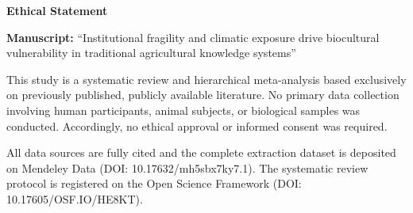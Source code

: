 \documentclass[12pt]{article}
\begin{document}
\begin{center}
{\Large\bfseries Ethical Statement}
\end{center}

\vspace{12pt}

\noindent
\textbf{Manuscript:} ``Institutional fragility and climatic exposure drive biocultural vulnerability in traditional agricultural knowledge systems''

\vspace{12pt}

\noindent
This study is a systematic review and hierarchical meta-analysis based exclusively on previously published, publicly available literature. No primary data collection involving human participants, animal subjects, or biological samples was conducted. Accordingly, no ethical approval or informed consent was required.

\vspace{12pt}

\noindent
All data sources are fully cited and the complete extraction dataset is deposited on Mendeley Data (DOI: 10.17632/mh5sbx7ky7.1). The systematic review protocol is registered on the Open Science Framework (DOI: 10.17605/OSF.IO/HE8KT).
\end{document}
